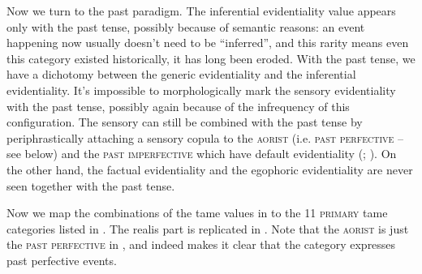 \documentclass[a4paper, oneside, 12pt]{report}
\newcommand*{\citesec}[1]{\S~{#1}}
\newcommand*{\citetable}[1]{Table~{#1}}
\newcommand*{\citepage}[1]{p.~{#1}}
\newcommand{\category}[1]{\textsc{#1}}
\begin{document}
Now we turn to the past paradigm.
The inferential evidentiality value appears only with the past tense,
possibly because of semantic reasons: 
an event happening now usually doesn't need to be ``inferred'',
and this rarity means even this category existed historically,
it has long been eroded.
With the past tense, 
we have a dichotomy between the generic evidentiality and the inferential evidentiality.
It's impossible to morphologically mark the sensory evidentiality
with the past tense, 
possibly again because of the infrequency of this configuration.  
The sensory can still be combined with the past tense 
by periphrastically attaching a sensory copula 
to the \category{aorist} (i.e. \category{past perfective} -- see below) 
and the \category{past imperfective}
which have default evidentiality
(\citealt[\citesec{21.5.1.8}, \citesec{21.5.3.5}]{jacques2021grammar}; 
\citealt[\citepage{518}]{jacques2019egophoric}). 
On the other hand, the factual evidentiality and the egophoric evidentiality
are never seen together with the past tense.

Now we map the combinations of the \ac{tame} values in 
to the 11 \category{primary} \acs{tame} categories 
listed in \citet[\citesec{21.1}]{jacques2021grammar}.
The realis part is replicated in .
Note that the \category{aorist} is just the \category{past perfective} in
\citet[\citetable{31.4}]{jacques2015sketch}, 
and indeed \citet[\citepage{1135}]{jacques2021grammar}
makes it clear that the category expresses past perfective events.
\end{document}
